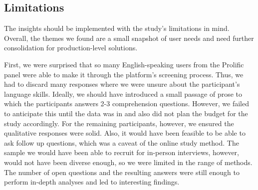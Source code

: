 


\subsection{Limitations}
The insights should be implemented with the study's limitations in mind. Overall, the themes we found are a small snapshot of user needs and need further consolidation for production-level solutions. 

First, we were surprised that so many English-speaking users from the Prolific panel were able to make it through the platform's screening process. Thus, we had to discard many responses where we were unsure about the participant's language skills. Ideally, we should have introduced a small passage of prose to which the participants answers 2-3 comprehension questions. However, we failed to anticipate this until the data was in and also did not plan the budget for the study accordingly. For the remaining participants, however, we ensured the qualitative responses were solid. 
Also, it would have been feasible to be able to ask follow up questions, which was a caveat of the online study method. The sample we would have been able to recruit for in-person interviews, however, would not have been diverse enough, so we were limited in the range of methods. The number of open questions and the resulting answers were still enough to perform in-depth analyses and led to interesting findings. %


